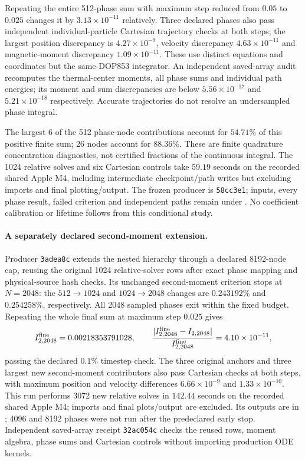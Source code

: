 \documentclass[11pt,letterpaper]{article}
\begin{document}
Repeating the entire 512-phase sum with maximum step reduced from $0.05$ to
$0.025$ changes it by $3.13\times10^{-11}$ relatively. Three declared
phases also pass independent individual-particle Cartesian trajectory checks
at both steps; the largest position discrepancy is $4.27\times10^{-9}$,
velocity discrepancy $4.63\times10^{-11}$ and magnetic-moment discrepancy
$1.09\times10^{-11}$. These use distinct equations and coordinates but the
same DOP853 integrator. An independent saved-array audit recomputes the
thermal-center moments, all phase sums and individual path energies; its
moment and sum discrepancies are below $5.56\times10^{-17}$ and
$5.21\times10^{-18}$ respectively. Accurate trajectories do not resolve an
undersampled phase integral.

The largest 6 of the 512 phase-node contributions account for $54.71\%$ of
this positive finite sum; 26 nodes account for $88.36\%$. These are finite
quadrature concentration diagnostics, not certified fractions of the
continuous integral. The 1024 relative solves and six Cartesian controls
take $59.19$ seconds on the recorded shared Apple M4, including intermediate
checkpoint/path writes but excluding imports and final plotting/output.
The frozen producer is \texttt{58cc3e1}; inputs, every phase result,
failed criterion and independent paths remain under
. No coefficient calibration or lifetime
follows from this conditional study.

\paragraph{A separately declared second-moment extension.}
Producer \texttt{3adea8c} extends the nested hierarchy through a declared
8192-node cap, reusing the original 1024 relative-solver rows after exact
phase mapping and physical-source hash checks. Its unchanged second-moment
criterion stops at $N=2048$: the $512\to1024$ and $1024\to2048$ changes
are $0.243192\%$ and $0.254258\%$, respectively. All 2048 sampled phases
exit within the fixed budget. Repeating the whole final sum at maximum step
$0.025$ gives
\[
 I_{2,2048}^{\rm fine}=0.00218353791028,
 \qquad
 \frac{|I_{2,2048}^{\rm fine}-I_{2,2048}|}{I_{2,2048}^{\rm fine}}
 =4.10\times10^{-11},
\]
passing the declared $0.1\%$ timestep check. The three original anchors and
three largest new second-moment contributors also pass Cartesian checks at
both steps, with maximum position and velocity differences
$6.66\times10^{-9}$ and $1.33\times10^{-10}$. This run performs 3072 new
relative solves in $142.44$ seconds on the recorded shared Apple M4;
imports and final plots/output are excluded. Its outputs are in
; 4096 and 8192 phases were not
run after the predeclared early stop. Independent saved-array receipt
\texttt{32ac054c} checks the reused rows, moment algebra, phase sums and
Cartesian controls without importing production ODE kernels.
\end{document}
